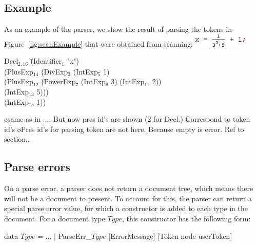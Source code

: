 \documentclass[12pt]{article}
\begin{document}
\subsection{Example} \label{sect:parseExample}

As an example of the parser, we show the result of parsing the tokens in Figure~\ref{fig:scanExample} that were obtained from scanning: \includegraphics[width=1in]{images/scanFrac}


\begin{footnotesize}
\begin{tabbedCode}
Decl$_{2,16}$ \= (Identifier$_1$ "x")\\ 
              \> (PlusExp$_{14}$ \= (DivExp$_3$ \= (IntExp$_5$ 1) \\
              \>                 \>             \> (PlusExp$_{12}$ \= (PowerExp$_7$ (IntExp$_9$ 3) (IntExp$_{11}$ 2))\\
              \>                 \>             \>                 \> (IntExp$_{13}$ 5)))\\
              \>                 \>(IntExp$_{15}$ 1))\\
\end{tabbedCode}
\end{footnotesize}

\bl
\o same as in .... But now pres id's are shown (2 for Decl.) Correspond to token id's
\o Pres id's for parsing token are not here. Because empty is error. Ref to section..
\el

\subsection{Parse errors} \label{sect:parseScanErrors}

On a parse error, a parser does not return a document tree, which means there will not be a document to present. To account for this, the parser can return a special parse error value, for which a constructor is added to each type in the document. For a document type $Type$, this constructor has the following form:

\begin{footnotesize}
\begin{tabbedCode}
data $Type$ =
  ...
  | ParseErr\_$Type$ [ErrorMessage] [Token node userToken] 
\end{tabbedCode}
\end{footnotesize}
\end{document}
